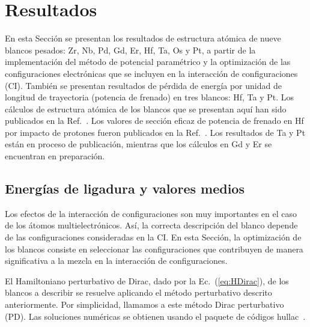 \section{Resultados}
\label{sec:results-heavy}

En esta Sección se presentan los resultados de estructura atómica de 
nueve blancos pesados: Zr, Nb, Pd, Gd, Er, Hf, Ta, Os y Pt, a 
partir de la implementación del método de potencial paramétrico y la
optimización de las configuraciones electrónicas que se incluyen en la 
interacción de configuraciones (CI).
También se presentan resultados de pérdida de energía por unidad de 
longitud de trayectoria (potencia de frenado) en tres blancos: Hf, Ta y 
Pt. Los cálculos de estructura atómica de los blancos que se presentan 
aquí han sido publicados en la Ref.~\cite{Mendez:19relat}. Los valores 
de sección eficaz de potencia de frenado en Hf por impacto de protones 
fueron publicados en la Ref.~\cite{Montanari:20}. Los resultados de Ta y 
Pt están en proceso de publicación, mientras que los cálculos en Gd y Er 
se encuentran en preparación. 

\subsection{Energías de ligadura y valores medios}
\label{subsec:results-target}

Los efectos de la interacción de configuraciones son muy importantes en 
el caso de los átomos multielectrónicos. Así, la correcta descripción 
del blanco depende de las configuraciones consideradas en la CI. En esta 
Sección, la optimización de los blancos consiste en seleccionar las 
configuraciones que contribuyen de manera significativa a la mezcla en 
la interacción de configuraciones. 

El Hamiltoniano perturbativo de Dirac, dado por la Ec.~(\ref{eq:HDirac}), 
de los blancos a describir se resuelve aplicando el método perturbativo 
descrito anteriormente. Por simplicidad, llamamos a este método Dirac 
perturbativo (PD). Las soluciones numéricas se obtienen 
usando el paquete de códigos {\sc hullac}~\cite{BarShalom:01}. 

